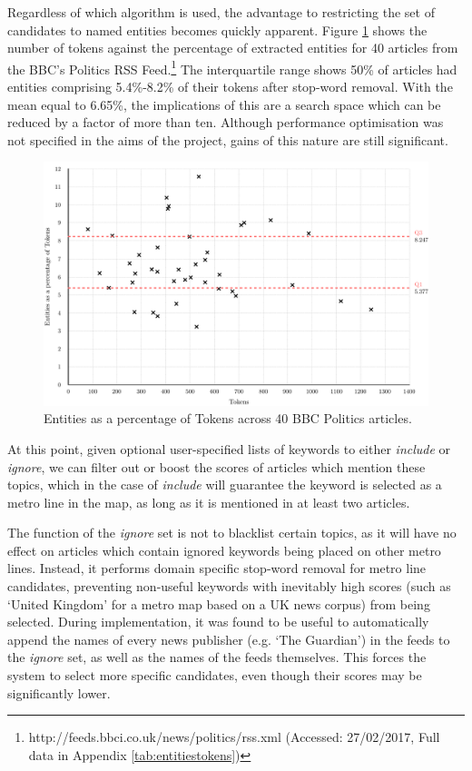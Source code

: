Regardless of which algorithm is used, the advantage to restricting the set of candidates to named entities becomes quickly apparent. Figure \ref{fig:tokensentities} shows the number of tokens against the percentage of extracted entities for 40 articles from the BBC's Politics RSS Feed.\footnote{http://feeds.bbci.co.uk/news/politics/rss.xml (Accessed: 27/02/2017, Full data in Appendix \ref{tab:entitiestokens})} The interquartile range shows 50\% of articles had entities comprising 5.4\%-8.2\% of their tokens after stop-word removal. With the mean equal to 6.65\%, the implications of this are a search space which can be reduced by a factor of more than ten. Although performance optimisation was not specified in the aims of the project, gains of this nature are still significant.

\begin{figure}[htbp!]
	\centering
	\includegraphics[width=\textwidth]{img/implementation/TokensEntities.pdf}
	\caption{Entities as a percentage of Tokens across 40 BBC Politics articles.}
	\label{fig:tokensentities}
\end{figure}

At this point, given optional user-specified lists of keywords to either \textit{include} or \textit{ignore}, we can filter out or boost the scores of articles which mention these topics, which in the case of \textit{include} will guarantee the keyword is selected as a metro line in the map, as long as it is mentioned in at least two articles. 

The function of the \textit{ignore} set is not to blacklist certain topics, as it will have no effect on articles which contain ignored keywords being placed on other metro lines. Instead, it performs domain specific stop-word removal for metro line candidates, preventing non-useful keywords with inevitably high scores (such as `United Kingdom' for a metro map based on a UK news corpus) from being selected. During implementation, it was found to be useful to automatically append the names of every news publisher (e.g. `The Guardian') in the feeds to the \textit{ignore} set, as well as the names of the feeds themselves. This forces the system to select more specific candidates, even though their scores may be significantly lower.

